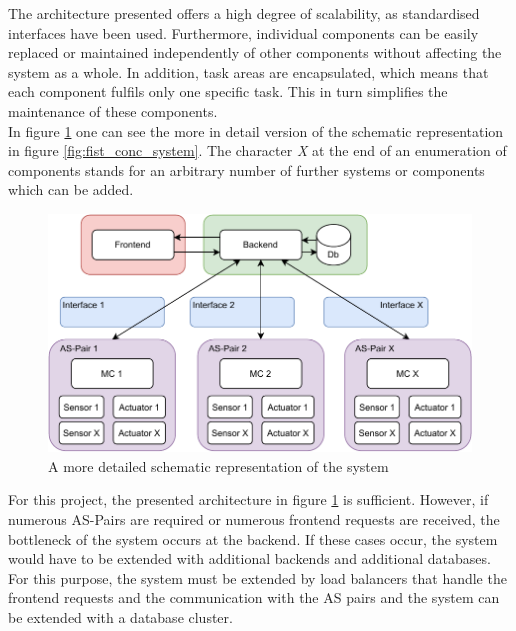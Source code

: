 The architecture presented offers a high degree of scalability, as standardised interfaces have been used. Furthermore, individual components can be easily replaced or maintained independently of other components without affecting the system as a whole. In addition, task areas are encapsulated, which means that each component fulfils only one specific task. This in turn simplifies the maintenance of these components.\\

In figure \ref{fig:scale_conc_system} one can see the more in detail version of the schematic representation in figure \ref{fig:fist_conc_system}. The character \textit{X} at the end of an enumeration of components stands for an arbitrary number of further systems or components which can be added.

\begin{figure}[H]
    \centering
    \includegraphics[width=.9\textwidth]{images/4_1/second_concept.pdf}
    \caption{A more detailed schematic representation of the system}
    \label{fig:scale_conc_system}
\end{figure}

For this project, the presented architecture in figure \ref{fig:scale_conc_system} is sufficient. However, if numerous AS-Pairs are required or numerous frontend requests are received, the bottleneck of the system occurs at the backend. If these cases occur, the system would have to be extended with additional backends and additional databases. For this purpose, the system must be extended by load balancers that handle the frontend requests and the communication with the AS pairs and the system can be extended with a database cluster.\\

